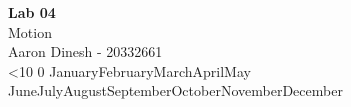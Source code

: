 \documentclass{article}
\author{Aaron Dinesh}
\date{\today}
\renewcommand{\today}{\ifnum\number\day<10 0\fi \number\day \space%
\ifcase \month \or January\or February\or March\or April\or May%
\or June\or July\or August\or September\or October\or November\or December\fi \space%
\number \year}
\begin{document}
    \fancyfoot{}


    \begin{titlepage}
        \vspace*{\fill}
        \begin{center}
          {\Huge \textbf{Lab 04}}\\[0.5cm]
          {\Large Motion}\\[0.4cm]
          {\Large Aaron Dinesh - 20332661}\\[0.3cm]
          \today
        \end{center}
        \vspace*{\fill}
    \end{titlepage}
    \newpage
    
    
\end{document}
